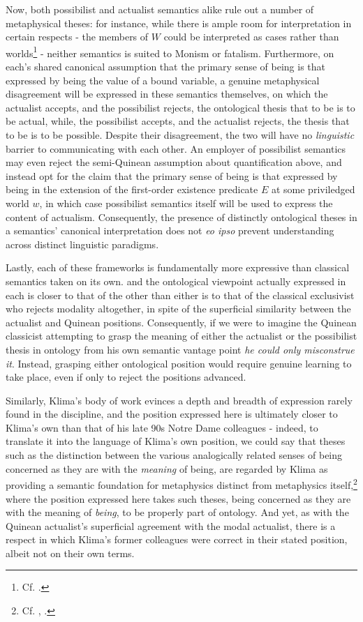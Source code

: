 \documentclass[]{article}
\begin{document}
Now, 
both possibilist and actualist semantics alike rule out a number of metaphysical theses: 
for instance, while there is ample room for interpretation in certain respects - 
the members of $W$ could be interpreted as cases rather than worlds\footnote{Cf. \autocite{CIFOL1,CIFOL2}.} - 
neither semantics is suited to Monism or fatalism. 
Furthermore, 
on each's shared canonical assumption that the primary sense of being is that expressed by being the value of a bound variable, 
a genuine metaphysical disagreement will be expressed in these semantics themselves, 
on which the actualist accepts, 
and the possibilist rejects, 
the ontological thesis that to be is to be actual, 
while, the possibilist accepts, 
and the actualist rejects, 
the thesis that to be is to be possible. 
Despite their disagreement, the two will have no \emph{linguistic} barrier to communicating with each other. 
An employer of possibilist semantics may even reject the semi-Quinean assumption about quantification above, 
and instead opt for the claim 
that the primary sense of being is that expressed by being in the extension of the first-order existence predicate $E$ at some priviledged world $w$, 
in which case possibilist semantics itself will be used to express the content of actualism. 
Consequently, the presence of distinctly ontological theses in a semantics' canonical interpretation does not 
\emph{eo ipso} prevent understanding across distinct linguistic paradigms.  

Lastly, 
each of these frameworks is fundamentally more expressive than classical semantics taken on its own.
and the ontological viewpoint actually expressed in each is closer to that of the other than either is to that of the classical exclusivist who rejects modality altogether, 
in spite of the superficial similarity between the actualist and Quinean positions. 
Consequently, if we were to imagine the Quinean classicist attempting to grasp the meaning of either the actualist or the possibilist thesis in ontology 
from his own semantic vantage point
\emph{he could only misconstrue it}.
Instead, grasping either ontological position would require genuine learning to take place, 
even if only to reject the positions advanced. 

Similarly, 
Klima's body of work evinces a depth and breadth of expression rarely found in the discipline, 
and 
the position expressed here is ultimately closer to Klima's own than that of his late 90s Notre Dame colleagues - 
indeed, to translate it into the language of Klima's own position, 
we could say that theses such as the distinction between the various analogically related senses of being 
concerned as they are with the \emph{meaning} of being, 
are regarded by Klima as providing a semantic foundation for metaphysics distinct from metaphysics itself,\footnote{Cf. \autocite[88]{Klima1996}, \autocite[49]{Klima2011b}.}
where the position expressed here takes such theses, 
being concerned as they are with the meaning of \emph{being},
to be properly part of ontology. 
And yet, 
as with the Quinean actualist's superficial agreement with the modal actualist, 
there is a respect in which Klima's former colleagues were correct in their stated position, 
albeit not on their own terms. 
\end{document}
